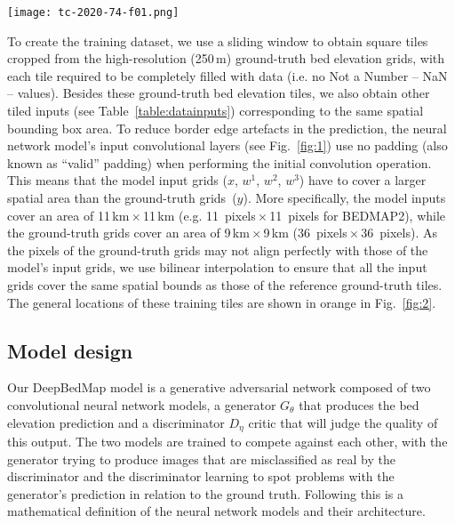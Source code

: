 \documentclass[tc, noline]{copernicus}
\begin{document}
\begin{figure*}[t]
\texttt{[image: tc-2020-74-f01.png]}
\caption{DeepBedMap generator model architecture composed of three modules. The input module processes each of the four inputs (BEDMAP2, \citealp{FretwellBedmap2improvedice2013}; REMA, \citealp{HowatReferenceElevationModel2019}; MEaSUREs Ice Velocity, \citealp{MouginotMEaSUREsPhaseMap2019}; snow accumulation, \citealp{ArthernAntarcticsnowaccumulation2006}; see also Table~\ref{table:datainputs}) into a consistent tensor. The core module processes the rich information contained within the concatenated inputs. The upsampling module scales the tensor up by 4 times and does some extra processing to produce the output DeepBedMap\_DEM.}
\label{fig:1}
\end{figure*}

To create the training dataset, we use a sliding window to obtain square tiles cropped from the high-resolution (250\,\unit{m}) ground-truth bed
elevation grids, with each tile required to be completely filled with data (i.e. no Not a Number -- NaN -- values). Besides these ground-truth bed elevation tiles, we
also obtain other tiled inputs (see Table~\ref{table:datainputs}) corresponding to the same spatial bounding box area. To reduce border edge artefacts
in the prediction, the neural network model's input convolutional layers (see Fig.~\ref{fig:1}) use no padding (also known as ``valid'' padding) when
performing the initial convolution operation. This means that the model input grids ($x$, $w^1$, $w^2$, $w^3$) have to cover a larger spatial area
than the ground-truth grids~($y$). More specifically, the model inputs cover an area of 11\,\unit{km}\,$\times$\,11\,\unit{km}
(e.g. 11~\unit{pixels}\,$\times$\,11~\unit{pixels} for BEDMAP2), while the ground-truth grids cover an area of 9\,\unit{km}\,$\times$\,9\,\unit{km}
(36~\unit{pixels}\,$\times$\,36~\unit{pixels}). As the pixels of the ground-truth grids may not align perfectly with those of the model's input grids,
we use bilinear interpolation to ensure that all the input grids cover the same spatial bounds as those of the reference ground-truth tiles. The general
locations of these training tiles are shown in orange in Fig.~\ref{fig:2}.


\subsection{Model design}\label{section:modeldesign}

Our DeepBedMap model is a generative adversarial network \citep{GoodfellowGenerativeAdversarialNetworks2014} composed of two convolutional neural
network models, a generator $G_\theta$ that produces the bed elevation prediction and a discriminator $D_\eta$ critic that will judge the quality of
this output. The two models are trained to compete against each other, with the generator trying to produce images that are misclassified as real by
the discriminator and the discriminator learning to spot problems with the generator's prediction in relation to the ground truth. Following this is a
mathematical definition of the neural network models and their architecture.
\end{document}
